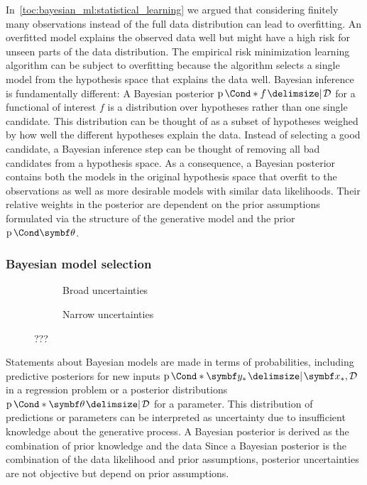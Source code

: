 In~\cref{toc:bayesian_ml:statistical_learning} we argued that considering finitely many observations instead of the full data distribution can lead to overfitting.
An overfitted model explains the observed data well but might have a high risk for unseen parts of the data distribution.
The empirical risk minimization learning algorithm can be subject to overfitting because the algorithm selects a single model from the hypothesis space that explains the data well.
Bayesian inference is fundamentally different:
A Bayesian posterior $\Prob*{f \given \Dc}$ for a functional of interest $f$ is a distribution over hypotheses rather than one single candidate.
This distribution can be thought of as a subset of hypotheses weighed by how well the different hypotheses explain the data.
Instead of selecting a good candidate, a Bayesian inference step can be thought of removing all bad candidates from a hypothesis space.
As a consequence, a Bayesian posterior contains both the models in the original hypothesis space that overfit to the observations as well as more desirable models with similar data likelihoods.
Their relative weights in the posterior are dependent on the prior assumptions formulated via the structure of the generative model and the prior $\Prob{\mat{\theta}}$.


\subsubsection{Bayesian model selection}
\begin{figure}[t]
    \begin{subfigure}[b]{\halffigurewidth}
        \centering
        \caption{
            Broad uncertainties
            \label{fig:bayesian_ml:polynomials:bayes_broad}
        }
    \end{subfigure}
    \hfill
    \begin{subfigure}[b]{\halffigurewidth}
        \centering
        \caption{
            Narrow uncertainties
            \label{fig:bayesian_ml:polynomials:bayes_narrow}
        }
    \end{subfigure}
    \caption[ML Interpolation]{
        ???
        \label{fig:bayesian_ml:polynomials:bayes}
    }
\end{figure}
Statements about Bayesian models are made in terms of probabilities, including predictive posteriors for new inputs $\Prob*{\mat{y}_\ast \given \mat{x}_\ast, \Dc}$ in a regression problem or a posterior distributions $\Prob*{\mat{\theta} \given \Dc}$ for a parameter.
This distribution of predictions or parameters can be interpreted as uncertainty due to insufficient knowledge about the generative process.
A Bayesian posterior is derived as the combination of prior knowledge and the data
Since a Bayesian posterior is the combination of the data likelihood and prior assumptions, posterior uncertainties are not objective but depend on prior assumptions.

